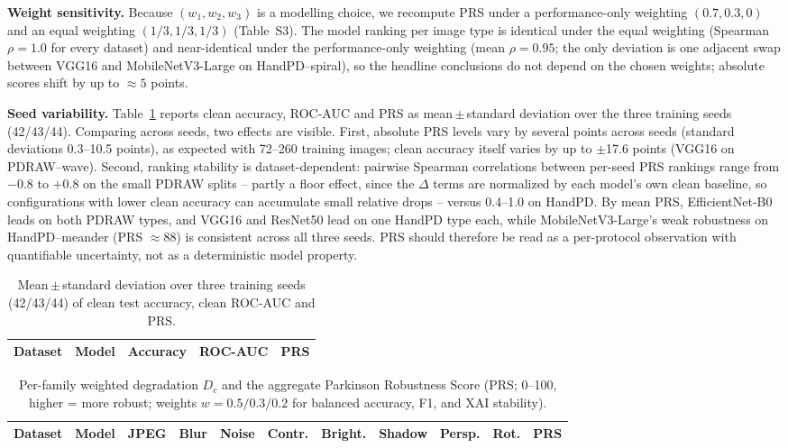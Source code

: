 \documentclass[11pt,a4paper]{article}
\begin{document}
\textbf{Weight sensitivity.} Because $(w_1, w_2, w_3)$ is a modelling choice,
we recompute PRS under a performance-only weighting $(0.7, 0.3, 0)$ and an
equal weighting $(1/3, 1/3, 1/3)$ (Table~S3). The model ranking per image
type is identical under the equal weighting (Spearman $\rho = 1.0$ for every
dataset) and near-identical under the performance-only weighting (mean
$\rho = 0.95$; the only deviation is one adjacent swap between VGG16 and
MobileNetV3-Large on HandPD--spiral), so the headline conclusions do not
depend on the chosen weights; absolute scores shift by up to ${\approx}5$
points.

\textbf{Seed variability.} Table~\ref{tab:seeds} reports clean accuracy,
ROC-AUC and PRS as mean\,$\pm$\,standard deviation over the three training
seeds (42/43/44). Comparing across seeds, two effects are visible. First, absolute PRS levels vary by
several points across seeds (standard deviations 0.3--10.5 points), as
expected with 72--260 training images; clean accuracy itself varies by up to
$\pm$17.6 points (VGG16 on PDRAW--wave). Second, ranking stability is
dataset-dependent: pairwise Spearman correlations between per-seed PRS
rankings range from $-0.8$ to $+0.8$ on the small PDRAW splits -- partly a
floor effect, since the $\Delta$ terms are normalized by each model's own
clean baseline, so configurations with lower clean accuracy can accumulate
small relative drops -- versus 0.4--1.0 on HandPD. By mean PRS,
EfficientNet-B0 leads on both PDRAW types, and VGG16 and ResNet50 lead on
one HandPD type each, while MobileNetV3-Large's weak robustness on
HandPD--meander (PRS ${\approx}88$) is consistent across all three seeds.
PRS should therefore be read as a per-protocol observation with
quantifiable uncertainty, not as a deterministic model property.

\begin{table}[t]
\centering\small
\caption{Mean\,$\pm$\,standard deviation over three training seeds
(42/43/44) of clean test accuracy, clean ROC-AUC and PRS.}
\label{tab:seeds}
\begin{tabular}{llccc}
\toprule
Dataset & Model & Accuracy & ROC-AUC & PRS \\
\midrule

\bottomrule
\end{tabular}
\end{table}

\begin{table}[t]
\centering\small
\caption{Per-family weighted degradation $D_c$ and the aggregate Parkinson
Robustness Score (PRS; 0--100, higher = more robust; weights
$w = 0.5/0.3/0.2$ for balanced accuracy, F1, and XAI stability).}
\label{tab:robustness}
\begin{tabular}{llcccccccc}
\toprule
Dataset & Model & JPEG & Blur & Noise & Contr. & Bright. & Shadow & Persp. & Rot. & PRS \\
\midrule

\bottomrule
\end{tabular}
\end{table}
\end{document}

